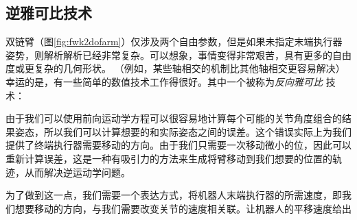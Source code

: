 


\subsection {逆雅可比技术} 
\label{sec:invjac}
双链臂（图\ref{fig:fwk2dofarm}）仅涉及两个自由参数，但是如果未指定末端执行器姿势，则解析解析已经非常复杂。可以想象，事情变得非常艰苦，具有更多的自由度或更复杂的几何形状。 （例如，某些轴相交的机制比其他轴相交更容易解决）幸运的是，有一些简单的数值技术工作得很好。其中一个被称为\emph {反向雅可比} 技术：

由于我们可以使用前向运动学方程可以很容易地计算每个可能的关节角度组合的结果姿态，所以我们可以计算想要的和实际姿态之间的误差。这个错误实际上为我们提供了终端执行器需要移动的方向。由于我们只需要一次移动微小的位，因此可以重新计算误差，这是一种有吸引力的方法来生成将臂移动到我们想要的位置的轨迹，从而解决逆运动学问题。

为了做到这一点，我们需要一个表达方式，将机器人末端执行器的所需速度，即我们想要移动的方向，与我们需要改变关节的速度相关联。让机器人的平移速度给出

